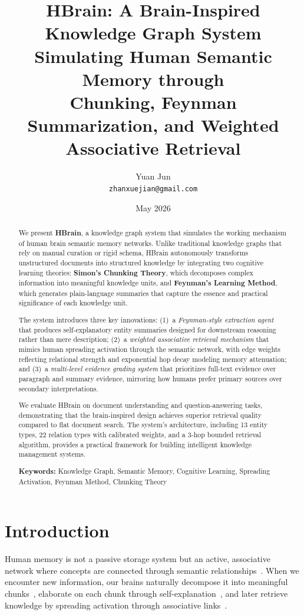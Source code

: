 \documentclass[11pt]{article}
\title{HBrain: A Brain-Inspired Knowledge Graph System\\
Simulating Human Semantic Memory through\\
Chunking, Feynman Summarization, and Weighted Associative Retrieval}
\author{
  Yuan Jun\\
  \texttt{zhanxuejian@gmail.com}
}
\date{May 2026}
\begin{document}
\maketitle

\begin{abstract}
We present \textbf{HBrain}, a knowledge graph system that simulates the working mechanism of human brain semantic memory networks. Unlike traditional knowledge graphs that rely on manual curation or rigid schema, HBrain autonomously transforms unstructured documents into structured knowledge by integrating two cognitive learning theories: \textbf{Simon's Chunking Theory}, which decomposes complex information into meaningful knowledge units, and \textbf{Feynman's Learning Method}, which generates plain-language summaries that capture the essence and practical significance of each knowledge unit.

The system introduces three key innovations: (1)~a \textit{Feynman-style extraction agent} that produces self-explanatory entity summaries designed for downstream reasoning rather than mere description; (2)~a \textit{weighted associative retrieval mechanism} that mimics human spreading activation through the semantic network, with edge weights reflecting relational strength and exponential hop decay modeling memory attenuation; and (3)~a \textit{multi-level evidence grading system} that prioritizes full-text evidence over paragraph and summary evidence, mirroring how humans prefer primary sources over secondary interpretations.

We evaluate HBrain on document understanding and question-answering tasks, demonstrating that the brain-inspired design achieves superior retrieval quality compared to flat document search. The system's architecture, including 13 entity types, 22 relation types with calibrated weights, and a 3-hop bounded retrieval algorithm, provides a practical framework for building intelligent knowledge management systems.

\medskip
\noindent\textbf{Keywords:} Knowledge Graph, Semantic Memory, Cognitive Learning, Spreading Activation, Feynman Method, Chunking Theory
\end{abstract}

\section{Introduction}
\label{sec:introduction}

Human memory is not a passive storage system but an active, associative network where concepts are connected through semantic relationships~\cite{collins1969semantic}. When we encounter new information, our brains naturally decompose it into meaningful chunks~\cite{miller1956magical}, elaborate on each chunk through self-explanation~\cite{chi1989self}, and later retrieve knowledge by spreading activation through associative links~\cite{anderson1983architecture}.
\end{document}
